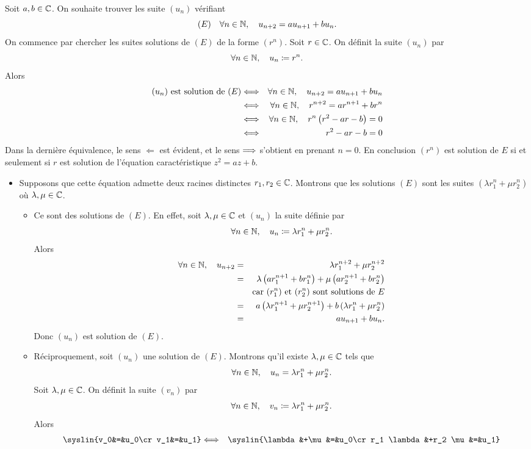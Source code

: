 \documentclass{magnolia}
\begin{document}
\begin{preuve}
Soit $a,b\in\mathbb{C}$. On souhaite trouver les suite $(u_n)$ vérifiant
\[(E)\quad\forall n\in\mathbb{N} ,\quad u_{n+2}=au_{n+1}+b u_n.\]
On commence par chercher les suites solutions de $(E)$ de la forme $(r^n)$. Soit $r\in\mathbb{C}$. On définit la suite $(u_n)$ par
\[\forall n\in\mathbb{N},\quad u_n\coloneqq r^n.\]
Alors
\begin{eqnarray*}
\text{$(u_n)$ est solution de $(E)$}
&\Longleftrightarrow& \forall n\in\mathbb{N},\quad u_{n+2}=au_{n+1}+b u_n\\
&\Longleftrightarrow& \forall n\in\mathbb{N},\quad r^{n+2}=a r^{n+1}+b r^n\\
&\Longleftrightarrow& \forall n\in\mathbb{N},\quad r^n\left(r^2-ar-b\right)=0\\
&\Longleftrightarrow& r^2-ar-b=0
\end{eqnarray*}
Dans la dernière équivalence, le sens $\Longleftarrow$ est évident, et le sens $\Longrightarrow$ s'obtient en prenant $n=0$. En conclusion $(r^n)$ est solution de $E$ si et seulement si $r$ est solution de l'équation caractéristique $z^2=az+b$.
\begin{itemize}
\item Supposons que cette équation admette deux racines distinctes $r_1, r_2\in\mathbb{C}$. Montrons que les solutions $(E)$ sont les suites $(\lambda r_1^n+\mu r_2^n)$ où $\lambda,\mu\in\mathbb{C}$.
\begin{itemize}
\item Ce sont des solutions de $(E)$. En effet, soit $\lambda,\mu\in\mathbb{C}$ et $(u_n)$ la suite définie par
\[\forall n\in\mathbb{N},\quad u_n\coloneqq\lambda r_1^n+\mu r_2^n.\]
Alors
\begin{eqnarray*}
\forall n\in\mathbb{N},\quad u_{n+2}
&=& \lambda r_1^{n+2} + \mu r_2^{n+2}\\
&=& \lambda \left(a r_1^{n+1}+b r_1^n\right) + \mu \left(a r_2^{n+1}+b r_2^n\right)\\
& & \text{car $(r_1^n)$ et $(r_2^n)$ sont solutions de $E$}\\
&=& a\left(\lambda r_1^{n+1}+\mu r_2^{n+1}\right) + b\left(\lambda r_1^n + \mu r_2^n\right)\\
&=& a u_{n+1}+b u_n.
\end{eqnarray*}
Donc $(u_n)$ est solution de $(E)$.
\item Réciproquement, soit $(u_n)$ une solution de $(E)$. Montrons qu'il existe $\lambda,\mu\in\mathbb{C}$ tels que
\[\forall n\in\mathbb{N},\quad u_n=\lambda r_1^n+\mu r_2^n.\]
Soit $\lambda,\mu\in\mathbb{C}$. On définit la suite $(v_n)$ par
\[\forall n\in\mathbb{N},\quad v_n\coloneqq\lambda r_1^n+\mu r_2^n.\]
Alors
\begin{eqnarray*}
\syslin{v_0&=&u_0\cr v_1&=&u_1}
&\ssi& \syslin{\lambda &+\mu&=&u_0\cr r_1 \lambda&+r_2 \mu&=&u_1}\\

\end{eqnarray*}
\end{itemize}
\end{itemize}
\end{preuve}
\end{document}
